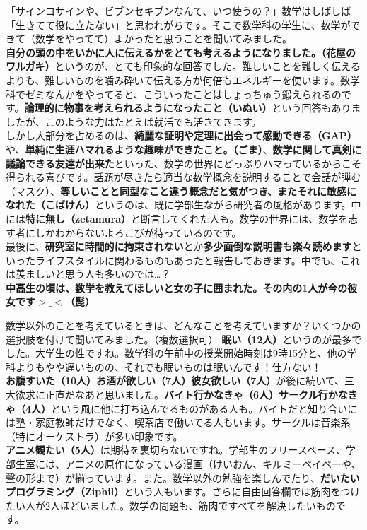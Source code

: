 「サインコサインや、ビブンセキブンなんて、いつ使うの？」数学はしばしば「生きてて役に立たない」と思われがちです。そこで数学科の学生に、数学ができて（数学をやってて）よかったと思うことを聞いてみました。\\
{\bf 自分の頭の中をいかに人に伝えるかをとても考えるようになりました。（花屋のワルガキ）}というのが、とても印象的な回答でした。難しいことを難しく伝えるよりも、難しいものを噛み砕いて伝える方が何倍もエネルギーを使います。数学科でゼミなんかをやってると、こういったことはしょっちゅう鍛えられるのです。{\bf 論理的に物事を考えられるようになったこと（いぬい）}という回答もありましたが、このような力はたとえば就活でも活きてきます。\\
しかし大部分を占めるのは、{\bf 綺麗な証明や定理に出会って感動できる（GAP）}や、{\bf 単純に生涯ハマれるような趣味ができたこと。（ごま）}、{\bf 数学に関して真剣に議論できる友達が出来た}といった、数学の世界にどっぷりハマっているからこそ得られる喜びです。{話題が尽きたら適当な数学概念を説明することで会話が弾む（マスク）}、{\bf 等しいことと同型なこと違う概念だと気がつき、またそれに敏感になれた（こばけん）}というのは、既に学部生ながら研究者の風格があります。中には{\bf 特に無し（zetamura）}と断言してくれた人も。数学の世界には、数学を志す者にしかわからないよろこびが待っているのです。\\
最後に、{\bf 研究室に時間的に拘束されない}とか{\bf 多少面倒な説明書も楽々読めます}といったライフスタイルに関わるものもあったと報告しておきます。中でも、これは羨ましいと思う人も多いのでは…？\\
{\bf 中高生の頃は、数学を教えてほしいと女の子に囲まれた。その内の1人が今の彼女です$>\_<$（髭）}

数学以外のことを考えているときは、どんなことを考えていますか？いくつかの選択肢を付けて聞いてみました。（複数選択可）
{\bf 眠い（12人）}というのが最多でした。大学生の性ですね。数学科の午前中の授業開始時刻は9時15分と、他の学科よりもやや遅いものの、それでも眠いものは眠いんです！仕方ない！\\
{\bf お腹すいた（10人）}{\bf お酒が欲しい（7人）}{\bf 彼女欲しい（7人）}が後に続いて、三大欲求に正直だなあと思いました。{\bf バイト行かなきゃ（6人）}{\bf サークル行かなきゃ（4人）}という風に他に打ち込んでるものがある人も。バイトだと知り合いには塾・家庭教師だけでなく、喫茶店で働いてる人もいます。サークルは音楽系（特にオーケストラ）が多い印象です。\\
{\bf アニメ観たい（5人）}は期待を裏切らないですね。学部生のフリースペース、学部生室には、アニメの原作になっている漫画（けいおん、キルミーベイベーや、聲の形まで）が揃っています。また。数学以外の勉強を楽しんでたり、{\bf だいたいプログラミング（Ziphil）}という人もいます。さらに自由回答欄では筋肉をつけたい人が2人ほどいました。数学の問題も、筋肉ですべてを解決したいものです。

